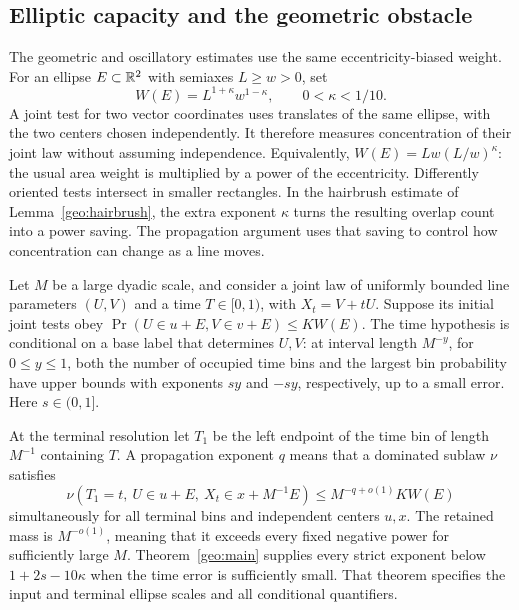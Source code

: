 \subsection{Elliptic capacity and the geometric obstacle}

The geometric and oscillatory estimates use the same eccentricity-biased
weight. For an ellipse \(E\subset\mathbb R^2\) with semiaxes \(L\ge w>0\), set
\[
 W(E)=L^{1+\kappa}w^{1-\kappa},\qquad 0<\kappa<1/10.
\]
A joint test for two vector coordinates uses translates of the same
ellipse, with the two centers chosen independently. It therefore
measures concentration of their joint law without assuming independence.
Equivalently, $W(E)=Lw(L/w)^\kappa$: the usual area weight is
multiplied by a power of the eccentricity. Differently oriented tests
intersect in smaller rectangles. In the hairbrush estimate of
Lemma~\ref{geo:hairbrush}, the extra exponent $\kappa$ turns the
resulting overlap count into a power saving. The propagation argument
uses that saving to control how concentration can change as a line moves.

Let \(M\) be a large dyadic scale, and consider a joint law of uniformly
bounded line parameters \((U,V)\) and a time \(T\in[0,1)\), with
\(X_t=V+tU\). Suppose its initial joint tests obey
\(\Pr(U\in u+E,V\in v+E)\le K W(E)\). The time hypothesis is
conditional on a base label that determines \(U,V\): at interval length
\(M^{-y}\), for \(0\le y\le1\), both the number of occupied time bins and the largest bin
probability have upper bounds with exponents \(sy\) and \(-sy\),
respectively, up to a small error. Here \(s\in(0,1]\).

At the terminal resolution let \(T_1\) be the left endpoint of the
time bin of length \(M^{-1}\) containing \(T\). A propagation exponent
\(q\) means that a dominated sublaw \(\nu\) satisfies
\[
 \nu(T_1=t,\ U\in u+E,\ X_t\in x+M^{-1}E)
       \le M^{-q+o(1)}K W(E)
\]
simultaneously for all terminal bins and independent centers \(u,x\).
The retained mass is \(M^{-o(1)}\), meaning that it exceeds every fixed
negative power for sufficiently large \(M\). Theorem~\ref{geo:main}
supplies every strict exponent below \(1+2s-10\kappa\) when the time
error is sufficiently small. That theorem specifies the input and
terminal ellipse scales and all conditional quantifiers.

